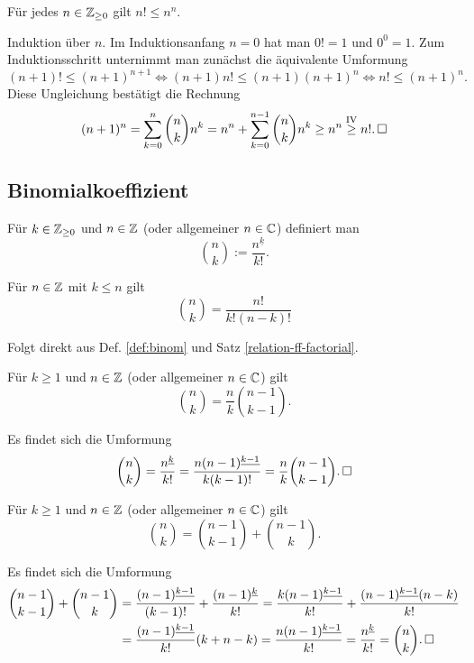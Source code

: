 \begin{Satz}
Für jedes $n\in\mathbb Z_{\ge 0}$ gilt $n!\le n^n$.
\end{Satz}
\begin{Beweis}
Induktion über $n$. Im Induktionsanfang $n=0$ hat man $0! = 1$ und $0^0=1$.
Zum Induktionsschritt unternimmt man zunächst die äquivalente Umformung
\[(n+1)!\le (n+1)^{n+1} \iff (n+1)n!\le (n+1)(n+1)^n
\iff n!\le (n+1)^n.\]
Diese Ungleichung bestätigt die Rechnung
\[(n+1)^n = \sum_{k=0}^n\binom{n}{k}n^k =
n^n+\sum_{k=0}^{n-1}\binom{n}{k}n^k\ge n^n
\stackrel{\mathrm{IV}}\ge n!.\,\square\]
\end{Beweis}

\newpage
\subsection{Binomialkoeffizient}

\begin{Definition}[Binomialkoeffizient]%
\label{def:binom}\newlinefirst
Für $k\in\mathbb Z_{\ge 0}$ und $n\in\mathbb Z$ (oder allgemeiner $n\in\mathbb C$)
definiert man
\[\binom{n}{k} := \frac{n^{\underline k}}{k!}.\]
\end{Definition}

\begin{Satz}
Für $n\in\mathbb Z$ mit $k\le n$ gilt
\[\binom{n}{k} = \frac{n!}{k!(n-k)!}\]
\end{Satz}
\begin{Beweis}
Folgt direkt aus Def. \ref{def:binom} und Satz
\ref{relation-ff-factorial}.\,\qedsymbol
\end{Beweis}

\begin{Satz}
Für $k\ge 1$ und $n\in\mathbb Z$ (oder allgemeiner $n\in\mathbb C$) gilt
\[\binom{n}{k} = \frac{n}{k}\binom{n-1}{k-1}.\]
\end{Satz}
\begin{Beweis}
Es findet sich die Umformung
\[\binom{n}{k} = \frac{n^{\underline k}}{k!}
= \frac{n(n-1)^{\underline {k-1}}}{k(k-1)!}
= \frac{n}{k}\binom{n-1}{k-1}.\,\square\]
\end{Beweis}

\begin{Satz}
Für $k\ge 1$ und $n\in\mathbb Z$ (oder allgemeiner $n\in\mathbb C$) gilt
\[\binom{n}{k} = \binom{n-1}{k-1} + \binom{n-1}{k}.\]
\end{Satz}
\begin{Beweis}
Es findet sich die Umformung
\begin{align*}
\binom{n-1}{k-1} + \binom{n-1}{k}
&= \frac{(n-1)^{\underline{k-1}}}{(k-1)!} + \frac{(n-1)^{\underline k}}{k!}
= \frac{k(n-1)^{\underline{k-1}}}{k!} + \frac{(n-1)^{\underline{k-1}}(n-k)}{k!}\\
&= \frac{(n-1)^{\underline{k-1}}}{k!}(k + n -k)
= \frac{n(n-1)^{\underline{k-1}}}{k!}
= \frac{n^{\underline k}}{k!} = \binom{n}{k}.\,\square
\end{align*}
\end{Beweis}
